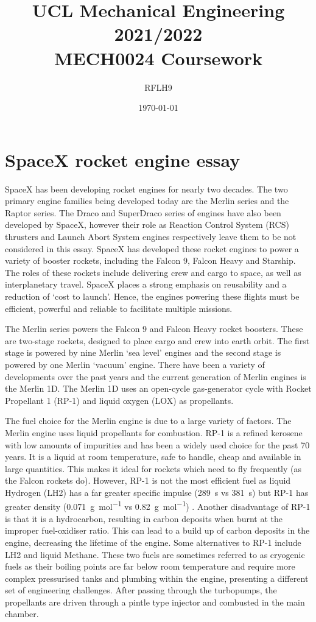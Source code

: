 \documentclass[11pt]{article}
\numberwithin{equation}{section}
\begin{document}
\title{\textbf{UCL Mechanical Engineering 2021/2022}\\MECH0024 Coursework}
\author{RFLH9}
\date{\today}
\maketitle
\tableofcontents
\listoffigures
\newpage
\part{SpaceX rocket engine essay}
SpaceX has been developing rocket engines for nearly two decades. The two primary engine families being developed today are the Merlin series and the Raptor series. The Draco and SuperDraco series of engines have also been developed by SpaceX, however their role as Reaction Control System (RCS) thrusters and Launch Abort System engines respectively leave them to be not considered in this essay. SpaceX has developed these rocket engines to power a variety of booster rockets, including the Falcon 9, Falcon Heavy and Starship. The roles of these rockets include delivering crew and cargo to space, as well as interplanetary travel. SpaceX places a strong emphasis on reusability and a reduction of `cost to launch'. Hence, the engines powering these flights must be efficient, powerful and reliable to facilitate multiple missions.

The Merlin series powers the Falcon 9 and Falcon Heavy rocket boosters. These are two-stage rockets, designed to place cargo and crew into earth orbit. The first stage is powered by nine Merlin `sea level' engines and the second stage is powered by one Merlin `vacuum' engine. There have been a variety of developments over the past years and the current generation of Merlin engines is the Merlin 1D. The Merlin 1D uses an open-cycle gas-generator cycle with Rocket Propellant 1 (RP-1) and liquid oxygen (LOX) as propellants.

The fuel choice for the Merlin engine is due to a large variety of factors. The Merlin engine uses liquid propellants for combustion. RP-1 is a refined kerosene with low amounts of impurities and has been a widely used choice for the past 70 years. It is a liquid at room temperature, safe to handle, cheap and available in large quantities. This makes it ideal for rockets which need to fly frequently (as the Falcon rockets do). However, RP-1 is not the most efficient fuel as liquid Hydrogen (LH2) has a far greater specific impulse (\SI{289}{\second} vs \SI{381}{\second}) but RP-1 has greater density (\SI{0.071}{\gram\per\mol} vs \SI{0.82}{\gram\per\mol}) \cite{b1}. Another disadvantage of RP-1 is that it is a hydrocarbon, resulting in carbon deposits when burnt at the improper fuel-oxidiser ratio. This can lead to a build up of carbon deposits in the engine, decreasing the lifetime of the engine. Some alternatives to RP-1 include LH2 and liquid Methane. These two fuels are sometimes referred to as cryogenic fuels as their boiling points are far below room temperature and require more complex pressurised tanks and plumbing within the engine, presenting a different set of engineering challenges. After passing through the turbopumps, the propellants are driven through a pintle type injector and combusted in the main chamber.
\end{document}
